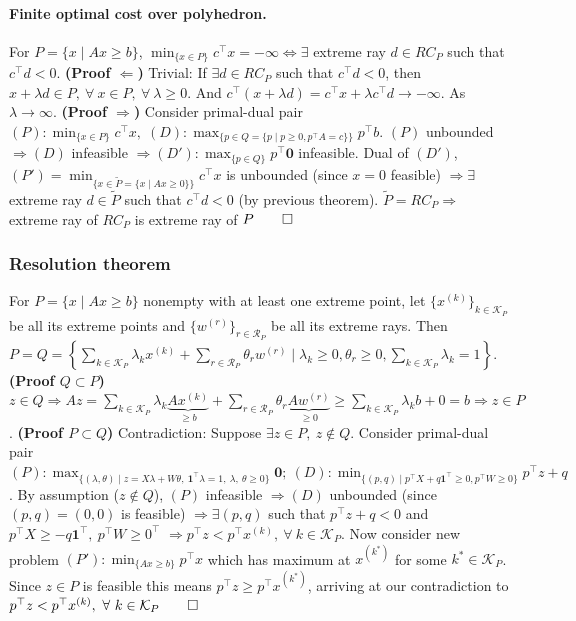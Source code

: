 \documentclass{article}
\begin{document}
\paragraph{Finite optimal cost over polyhedron.} For $P=\{x\mid Ax \geq b\}$, $\min_{\{x \in P\}} c^\top x = -\infty \iff \exists$ extreme ray $d\in RC_P$ such that $c^\top d < 0$. 
\textbf{(Proof $\Leftarrow$)} Trivial: If $\exists d \in RC_P$ such that $c^\top d < 0$, then $x + \lambda d \in P,\ \forall\ x\in P,\ \forall\ \lambda \geq 0$. And $c^\top (x + \lambda d) = c^\top x + \lambda c^\top d \to -\infty$. As $\lambda \rightarrow \infty$. 
\textbf{(Proof $\Rightarrow$)} Consider primal-dual pair $(P):\min_{\{x \in P\}} c^\top x,\; (D):\max_{\{p \in Q=\{p\mid p\geq 0, p^\top A=c\}\}} p^\top b$. $(P)$ unbounded $\Longrightarrow (D)$ infeasible $\Longrightarrow (D'):\max_{\{p \in Q\}}p^\top \mathbf{0}$ infeasible. Dual of $(D')$, $(P') = \min_{\{x \in \tilde P=\{x\mid Ax\geq 0\}\}} c^\top x$ is unbounded (since $x = 0$ feasible) $\Longrightarrow \exists$ extreme ray $d \in \tilde P$ such that $c^\top d < 0$ (by previous theorem).
$\tilde P = RC_P \Longrightarrow$ extreme ray of $RC_P$ is extreme ray of $P \qed$

\subsubsection{Resolution theorem}
For $P = \{x \mid Ax\geq b\}$ nonempty with at least one extreme point, let $\{x^{(k)}\}_{k\in \mathcal K_P}$ be all its extreme points and $\{w^{(r)}\}_{r\in \mathcal R_P}$ be all its extreme rays. 
Then $P = Q = \left\{\sum_{k\in\mathcal K_P} \lambda_kx^{(k)} + \sum_{r\in\mathcal R_P}\theta_rw^{(r)} \mid \lambda_k \geq 0, \theta_r \geq 0, \sum_{k\in\mathcal K_P}\lambda_k = 1\right\}$. 
\textbf{(Proof $Q \subset P$)} $z \in Q \Rightarrow Az = \sum_{k\in\mathcal K_P} \lambda_k\underbrace{Ax^{(k)}}_{\geq b} + \sum_{r\in\mathcal R_P}\theta_r\underbrace{Aw^{(r)}}_{\geq 0} \geq \sum_{k\in\mathcal K_P} \lambda_kb + 0 = b \Rightarrow z\in P$.
\textbf{(Proof $P \subset Q$)} Contradiction: Suppose $\exists z\in P,\ z \notin Q$. Consider primal-dual pair $(P):\max_{\{(\lambda, \theta) \mid z = X\lambda + W\theta,\ \mathbf{1}^\top \lambda = 1,\ \lambda,\ \theta \geq 0\}} \mathbf{0};\ (D):\min_{\{(p,q)\mid p^\top X + q\mathbf{1}^\top \geq 0,  p^\top W \geq 0 \}}p^\top z + q$. 
By assumption ($z \notin Q$), $(P)$ infeasible $\Longrightarrow (D)$ unbounded (since $(p,q)=(0,0)$ is feasible) $\Longrightarrow \exists (p,q)$ such that $p^\top z + q < 0$ and $p^\top X \geq -q\mathbf{1}^\top,\ p^\top W\geq 0^\top$
$\Longrightarrow p^\top z < p^\top x^{(k)},\ \forall\ k\in\mathcal K_P$. 
Now consider new problem $(P'): \min_{\{Ax \geq b\}}p^\top x$ which has maximum at $x^{(k^*)}$ for some $k^*\in\mathcal K_P$. Since $z\in P$ is feasible this means $p^\top z \geq p^\top x^{(k^*)}$, arriving at our contradiction to $p^\top z < p^\top x^{(k)},\ \forall\ k\in\mathcal K_P\qed$
\end{document}

